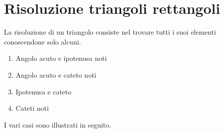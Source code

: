 \section{Risoluzione triangoli rettangoli}
La risoluzione di un triangolo consiste nel trovare tutti i suoi elementi conoscendone solo alcuni. 
\begin{enumerate}
	\item Angolo acuto e ipotenusa noti
	\item Angolo acuto e cateto noti
	\item Ipotenusa e cateto
	\item Cateti noti
\end{enumerate}
I vari casi sono illustrati in seguito. 

